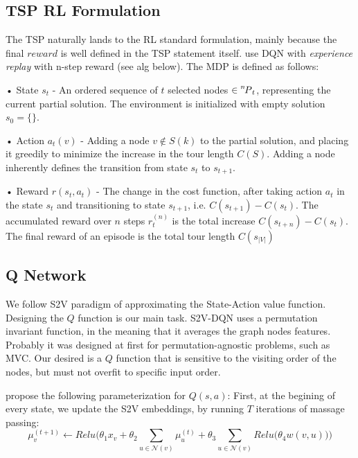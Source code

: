 \documentclass[10pt,a4paper,draft]{article}
\newcommand*\perm[2][^n]{\prescript{#1\mkern-2.5mu}{}P_{#2}}
\begin{document}
\subsection{TSP RL Formulation}	
The TSP naturally lands to the RL standard formulation, mainly because the final $reward$ is well defined in the TSP statement itself. 
\cite{dai17-tsp-s2v} use DQN with \textit{experience replay} with n-step reward (see alg below). The MDP is defined as follows:
\begin{list}{}{}
	\item[•] State $s_t$ - An ordered sequence of $t$ selected nodes $\in \perm[n]{t}$, representing the current partial solution. The environment is initialized with empty solution $s_0 = \{\}$.
	\item[•] Action $a_t(v)$ - Adding a node $v \not\in S(k)$ to the partial solution, and placing it greedily to minimize the increase in the tour length $C(S)$. Adding a node inherently defines the transition from state $s_t$ to $s_{t+1}$.
	\item[•] Reward $r(s_t,a_t)$ - The change in the cost function, after taking action $a_t$ in the state $s_t$ and transitioning to state $s_{t+1}$, i.e. $C(s_{t+1})-C(s_t)$. The accumulated reward over $n$ steps $r_t^{(n)}$ is the total increase $C(s_{t+n})-C(s_t)$. The final reward of an episode is the total tour length $C(s_{|V|})$
\end{list}


\subsection{Q Network}
We follow S2V paradigm of approximating the State-Action value function.
Designing the $Q$ function is our main task. S2V-DQN uses a permutation invariant function, in the meaning that it averages the graph nodes features. Probably it was designed at first for permutation-agnostic problems, such as MVC. Our desired is a $Q$ function that is sensitive to the visiting order of the nodes, but must not overfit to specific input order. 

\cite{dai17-tsp-s2v} propose the following parameterization for $Q(s,a)$:
First, at the begining of every state, we update the S2V embeddings, by running $T$ iterations of massage passing:
\begin{equation}
	\mu_v^{(t+1)} \leftarrow Relu\Bigg(\theta_1 x_v + \theta_2 \sum_{u \in \mathcal{N}(v)} \mu_u^{(t)} + \theta_3 \sum_{u \in \mathcal{N}(v)} Relu\big(\theta_4 w(v,u)\big)\Bigg)
\end{equation}
\end{document}
